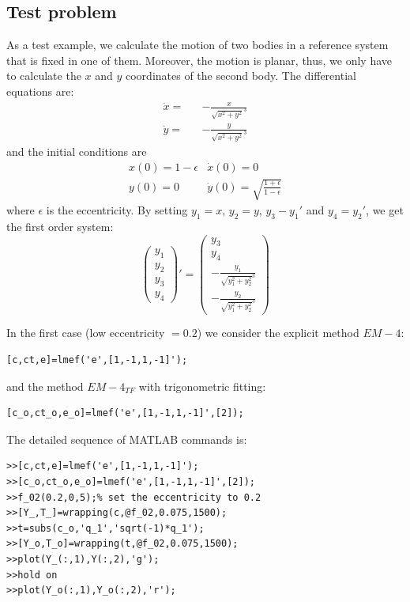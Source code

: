 \documentclass[acmtoms,acmnow]{acmtrans2m}
\begin{document}
\subsection{Test problem}
As a test example, we calculate the motion of two bodies in a reference system that is fixed in one of them. Moreover, the motion is planar, thus, we only have to calculate the $x$ and $y$ coordinates of the second body. The differential equations are:
\begin{eqnarray}
 \ddot{x}=&&-\frac{x}{\sqrt{x^2+y^2}^3} \nonumber \\
 \ddot{y}=&&-\frac{y}{\sqrt{x^2+y^2}^3} \nonumber 
\end{eqnarray}
and the initial conditions are
\begin{eqnarray}
 x(0)=1-\epsilon & \dot{x}(0)=0 \nonumber \\
y(0)=0 & \dot{y}(0)=\sqrt{\frac{1+\epsilon}{1-\epsilon}} \nonumber
\end{eqnarray}
where $\epsilon$ is the eccentricity. By setting $y_1=x$, $y_2=y$, $y_3-y_1'$ and $y_4=y_2'$, we get the first order system:
\begin{equation}
\left( \begin{array}{l}y_1 \\ y_2 \\ y_3 \\ y_4 \end{array}\right)'=\left( \begin{array}{l} y_3 \\ y_4 \\ -\frac{y_1}{\sqrt{y_1^2+y_2^2}^3} \\ -\frac{y_2}{\sqrt{y_1^2+y_2^2}^3} \end{array} \right)
\end{equation}

In the first case (low eccentricity $=0.2$) we consider the explicit method $EM-4$:
\begin{verbatim}
[c,ct,e]=lmef('e',[1,-1,1,-1]');
\end{verbatim}
and the method $EM-4_{TF}$ with trigonometric fitting:
\begin{verbatim}
[c_o,ct_o,e_o]=lmef('e',[1,-1,1,-1]',[2]);
\end{verbatim}
The detailed sequence of MATLAB commands is:
\begin{verbatim}
>>[c,ct,e]=lmef('e',[1,-1,1,-1]');
>>[c_o,ct_o,e_o]=lmef('e',[1,-1,1,-1]',[2]);
>>f_02(0.2,0,5);% set the eccentricity to 0.2
>>[Y_,T_]=wrapping(c,@f_02,0.075,1500);
>>t=subs(c_o,'q_1','sqrt(-1)*q_1');
>>[Y_o,T_o]=wrapping(t,@f_02,0.075,1500);
>>plot(Y_(:,1),Y(:,2),'g');
>>hold on
>>plot(Y_o(:,1),Y_o(:,2),'r');
\end{verbatim}
\end{document}
